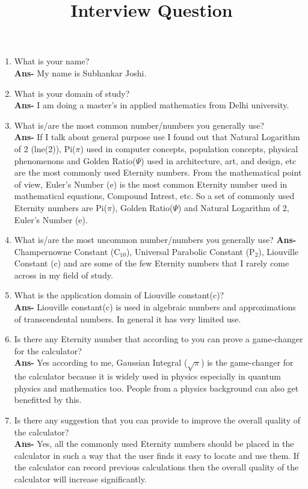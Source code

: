 \documentclass[13pt letterpaper]{article}
\begin{document}
\title{\textbf{Interview Question}}
\maketitle
\begin{enumerate}
\item What is your name?\\
\textbf{Ans-} My name is Subhankar Joshi.
\item What is your domain of study?\\
\textbf{Ans-} I am doing a master's in applied mathematics from Delhi university.
\item What is/are the most common number/numbers you generally use?\\
\textbf{Ans-} If I talk about general purpose use  I found out that Natural Logarithm of 2 (lne(2)), Pi($\pi$) used in computer concepts, population concepts, physical phenomenons and Golden Ratio($\Psi$) used in architecture, art, and design, etc are the most commonly used Eternity numbers. From the mathematical point of view, Euler’s Number (e) is the most common Eternity number used in mathematical equations, Compound Intrest, etc. So a set of commonly used Eternity numbers are Pi($\pi$), Golden Ratio($\Psi$) and Natural Logarithm of 2, Euler’s Number (e).
\item What is/are the most uncommon number/numbers you generally use?
\textbf{Ans-} Champernowne Constant (C$_{10}$), Universal Parabolic Constant (P$_{2}$), Liouville Constant (c) and are some of the few Eternity numbers that I rarely come across in my field of study. 
\item What is the application domain of Liouville constant(c)?\\
\textbf{Ans-} Liouville constant(c) is used in algebraic numbers and approximations of transcendental numbers. In general it has very limited use.
\item Is there any Eternity number that according to you can prove a game-changer for the calculator?\\
\textbf{Ans-} Yes according to me, Gaussian Integral ($\sqrt{\pi}$) is the game-changer for the calculator because it is widely used in physics especially in quantum physics and mathematics too. People from a physics background can also get benefitted by this.
\item Is there any suggestion that you can provide to improve the overall quality of the calculator?\\ 
\textbf{Ans-} Yes, all the commonly used Eternity numbers should be placed in the calculator in such a way that the user finds it easy to locate and use them. If the calculator can record previous calculations then the overall quality of the calculator will increase significantly. 
\end{enumerate}
\end{document}
